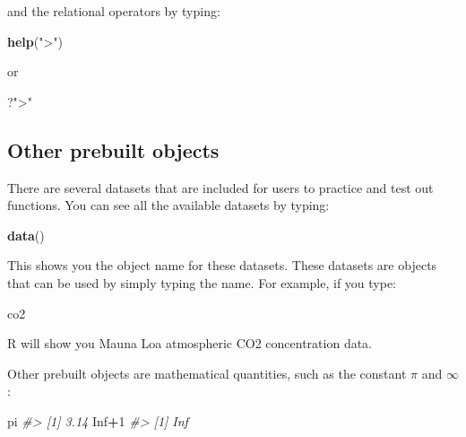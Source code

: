 \documentclass[
]{krantz}
\newenvironment{Shaded}{\begin{snugshade}}{\end{snugshade}}
\newcommand{\CommentTok}[1]{\textcolor[rgb]{0.37,0.37,0.37}{\textit{#1}}}
\newcommand{\DecValTok}[1]{\textcolor[rgb]{0.06,0.06,0.06}{#1}}
\newcommand{\KeywordTok}[1]{\textcolor[rgb]{0.27,0.27,0.27}{\textbf{#1}}}
\newcommand{\NormalTok}[1]{#1}
\newcommand{\OperatorTok}[1]{\textcolor[rgb]{0.43,0.43,0.43}{\textbf{#1}}}
\newcommand{\OtherTok}[1]{\textcolor[rgb]{0.37,0.37,0.37}{#1}}
\newcommand{\StringTok}[1]{\textcolor[rgb]{0.5,0.5,0.5}{#1}}
\begin{document}
and the relational operators by typing:

\begin{Shaded}
\begin{Highlighting}[]
\KeywordTok{help}\NormalTok{(}\StringTok{">"}\NormalTok{) }
\end{Highlighting}
\end{Shaded}

or

\begin{Shaded}
\begin{Highlighting}[]
\NormalTok{?}\StringTok{">"}
\end{Highlighting}
\end{Shaded}

\hypertarget{other-prebuilt-objects}{%
\subsection{Other prebuilt objects}\label{other-prebuilt-objects}}

There are several datasets that are included for users to practice and test out functions. You can see all the available datasets by typing:

\begin{Shaded}
\begin{Highlighting}[]
\KeywordTok{data}\NormalTok{()}
\end{Highlighting}
\end{Shaded}

This shows you the object name for these datasets. These datasets are objects that can be used by simply typing the name. For example, if you type:

\begin{Shaded}
\begin{Highlighting}[]
\NormalTok{co2}
\end{Highlighting}
\end{Shaded}

R will show you Mauna Loa atmospheric CO2 concentration data.

Other prebuilt objects are mathematical quantities, such as the constant \(\pi\) and \(\infty\):

\begin{Shaded}
\begin{Highlighting}[]
\NormalTok{pi}
\CommentTok{#> [1] 3.14}
\OtherTok{Inf}\OperatorTok{+}\DecValTok{1}
\CommentTok{#> [1] Inf}
\end{Highlighting}
\end{Shaded}
\end{document}
